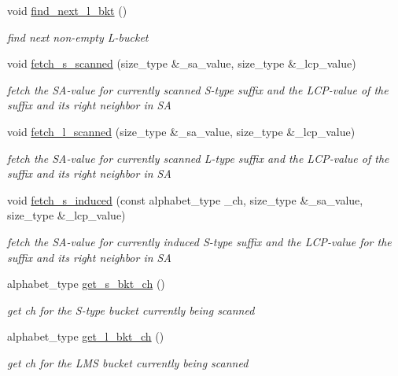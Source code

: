 \begin{DoxyCompactItemize}
void \hyperlink{struct_validate4_1_1_l_scan_abd7e922317ee9d64d90853adba6a7634}{find\+\_\+next\+\_\+l\+\_\+bkt} ()
\begin{DoxyCompactList}\small\item\em find next non-\/empty L-\/bucket \end{DoxyCompactList}\item 
void \hyperlink{struct_validate4_1_1_l_scan_a4e402bf4909c1502337801bd56e22be2}{fetch\+\_\+s\+\_\+scanned} (size\+\_\+type \&\+\_\+sa\+\_\+value, size\+\_\+type \&\+\_\+lcp\+\_\+value)
\begin{DoxyCompactList}\small\item\em fetch the S\+A-\/value for currently scanned S-\/type suffix and the L\+C\+P-\/value of the suffix and its right neighbor in SA \end{DoxyCompactList}\item 
void \hyperlink{struct_validate4_1_1_l_scan_a1fabfd83060b51fdedd46b413da0f060}{fetch\+\_\+l\+\_\+scanned} (size\+\_\+type \&\+\_\+sa\+\_\+value, size\+\_\+type \&\+\_\+lcp\+\_\+value)
\begin{DoxyCompactList}\small\item\em fetch the S\+A-\/value for currently scanned L-\/type suffix and the L\+C\+P-\/value of the suffix and its right neighbor in SA \end{DoxyCompactList}\item 
void \hyperlink{struct_validate4_1_1_l_scan_a37796b2c2e404a1bdf1362e7b1794fee}{fetch\+\_\+s\+\_\+induced} (const alphabet\+\_\+type \+\_\+ch, size\+\_\+type \&\+\_\+sa\+\_\+value, size\+\_\+type \&\+\_\+lcp\+\_\+value)
\begin{DoxyCompactList}\small\item\em fetch the S\+A-\/value for currently induced S-\/type suffix and the L\+C\+P-\/value for the suffix and its right neighbor in SA \end{DoxyCompactList}\item 
alphabet\+\_\+type \hyperlink{struct_validate4_1_1_l_scan_a1be5f226a5053456897df328302764f3}{get\+\_\+s\+\_\+bkt\+\_\+ch} ()
\begin{DoxyCompactList}\small\item\em get ch for the S-\/type bucket currently being scanned \end{DoxyCompactList}\item 
alphabet\+\_\+type \hyperlink{struct_validate4_1_1_l_scan_ae986f4106e79412c60be8a88a9637f66}{get\+\_\+l\+\_\+bkt\+\_\+ch} ()
\begin{DoxyCompactList}\small\item\em get ch for the L\+MS bucket currently being scanned \end{DoxyCompactList}\item 

\end{DoxyCompactItemize}
